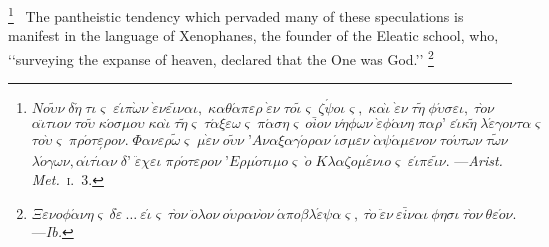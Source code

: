 \documentclass[oneside]{book}
\begin{document}
\footnote{$N{o}\tilde{\upsilon}\nu\; \delta\acute{\eta}\; \tau\iota\varsigma\; \varepsilon\acute{\iota}\pi\grave{\omega}\nu\; \grave{\varepsilon}\nu\varepsilon\tilde{\iota}\nu\alpha\iota,\; \kappa\alpha\theta\acute{\alpha}\pi\varepsilon\rho\; \grave{\varepsilon}\nu\; \tau{o}\tilde{\iota}\varsigma\; \zeta\acute{\psi}{o}\iota\varsigma,\; \kappa\alpha\grave{\iota}\; \grave{\varepsilon}\nu\; \tau\tilde{\eta}\; \phi\acute{\upsilon}\sigma\varepsilon\iota,\; \tau\grave{o}\nu$
%
 $\alpha\ddot{\iota}\tau\iota{o}\nu\; \tau{o}\tilde{\upsilon}\; \kappa\acute{o}\sigma\mu{o}\upsilon\; \kappa\alpha\grave{\iota}\; \tau\tilde{\eta}\varsigma\;
\tau\acute{\alpha}\xi\varepsilon\omega\varsigma\; \pi\acute{\alpha}\sigma\eta\varsigma\ {o}\bar{i}{o}\nu\; \nu\acute{\eta}\phi\omega\nu\; \grave{\varepsilon}\phi\acute{\alpha}\nu\eta\; \pi\alpha\rho\text{'}\; \varepsilon\acute{\iota}\kappa\tilde{\eta}\; \lambda\acute{\varepsilon}\gamma{o}\nu\tau\alpha\varsigma$
%
 $\tau{o}\grave{\upsilon}\varsigma\; \pi\rho\acute{o}\tau\underset{'}{\varepsilon}\rho{o}\nu.\; \Phi\alpha\nu\varepsilon\rho\tilde{\omega}\varsigma\; \mu\grave{\varepsilon}\nu\; {o}\tilde{\upsilon}\nu\; \text{'}A\nu\alpha\xi\alpha\gamma\acute{o}\rho\alpha\nu\; \acute{\iota}\sigma\mu\varepsilon\nu\; \grave{\alpha}\psi\acute{\alpha}\mu\varepsilon\nu{o}\nu\; \tau{o}\acute{\upsilon}\tau\omega\nu\; \tau\tilde{\omega}\nu\;$
%
$ \lambda\acute{o}\gamma\omega\nu,
 \alpha\acute{\iota}\tau\acute{\iota}\alpha\nu\; \delta\text{'}\; \ddot{\varepsilon}\chi\varepsilon\iota\; \pi\rho\acute{o}\tau\varepsilon\rho{o}\nu\; \text{'}E\rho\mu\acute{o}\tau\iota\mu{o}\varsigma\; \grave{o}\; K\lambda\alpha\zeta{o}\mu\acute{\varepsilon}\nu\iota{o}%
\varsigma\; \varepsilon\acute{\iota}\pi\varepsilon\tilde{\iota}\nu.$
---\textit{Arist. Met.}~\textsc{i.}~3.
}%
\ The pantheistic tendency which pervaded many of these
speculations is manifest in the language of Xenophanes, the
founder of the Eleatic school, who, \lq\lq surveying the expanse of
heaven, declared that the One was God.\rq\rq%
\footnote{$\Xi\varepsilon\nu{o}\phi\acute{\alpha}\nu\eta\varsigma\ \delta\grave{\varepsilon}\ \dotso\ \varepsilon\acute{\iota}\varsigma\ \tau\grave{o}\nu\ \ddot{o}\lambda{o}\nu\ {o}\acute{\upsilon}\rho\alpha\nu\grave{o}\nu\ \acute{\alpha}\pi{o}\beta\lambda\acute{\varepsilon}\psi\alpha\varsigma,\ \tau\grave{o}\ \ddot{\varepsilon}\nu\ \varepsilon\bar{i}\nu\alpha\iota\ \phi\eta\sigma\iota\ \tau\grave{o}\nu\
\theta\varepsilon\acute{o}\nu.$
---\textit{Ib.}
}%
\end{document}
